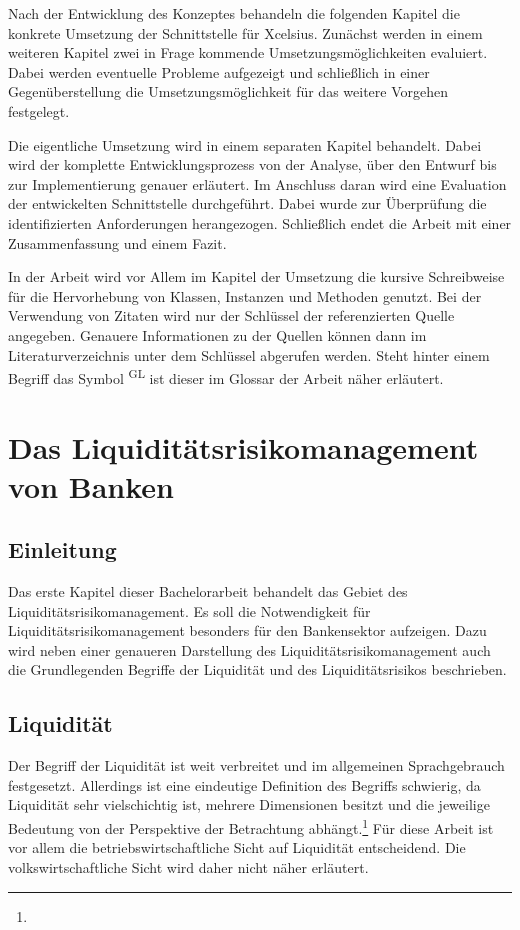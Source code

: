 \begin{onehalfspacing}
Nach der Entwicklung des Konzeptes behandeln die folgenden Kapitel die konkrete Umsetzung der Schnittstelle für Xcelsius. Zunächst werden in einem weiteren Kapitel zwei in Frage kommende Umsetzungsmöglichkeiten evaluiert. Dabei werden eventuelle Probleme aufgezeigt und schließlich in einer Gegenüberstellung die Umsetzungsmöglichkeit für das weitere Vorgehen festgelegt.

Die eigentliche Umsetzung wird in einem separaten Kapitel behandelt. Dabei wird der komplette Entwicklungsprozess von der Analyse, über den Entwurf bis zur Implementierung genauer erläutert.
Im Anschluss daran wird eine Evaluation der entwickelten Schnittstelle durchgeführt. Dabei wurde zur Überprüfung die identifizierten Anforderungen herangezogen. Schließlich endet die Arbeit mit einer Zusammenfassung und einem Fazit.

In der Arbeit wird vor Allem im Kapitel der Umsetzung die kursive Schreibweise für die Hervorhebung von Klassen, Instanzen und Methoden genutzt. Bei der Verwendung von Zitaten wird nur der Schlüssel der referenzierten Quelle angegeben. Genauere Informationen zu der Quellen können dann im Literaturverzeichnis unter dem Schlüssel abgerufen werden. Steht hinter einem Begriff das Symbol \textsuperscript{GL} ist dieser im Glossar der Arbeit näher erläutert.

\chapter{Das Liquiditätsrisikomanagement von Banken}

\section{Einleitung}
Das erste Kapitel dieser Bachelorarbeit behandelt das Gebiet des Liquiditätsrisikomanagement. Es soll die Notwendigkeit für Liquiditätsrisikomanagement besonders für den Bankensektor aufzeigen. Dazu wird neben einer genaueren Darstellung des Liquiditätsrisikomanagement auch die Grundlegenden Begriffe der Liquidität und des Liquiditätsrisikos beschrieben.

\section{Liquidität} 
Der Begriff der Liquidität ist weit verbreitet und im allgemeinen Sprachgebrauch festgesetzt. Allerdings ist eine eindeutige Definition des Begriffs schwierig, da Liquidität sehr vielschichtig ist, mehrere Dimensionen besitzt und die jeweilige Bedeutung von der Perspektive der Betrachtung abhängt.\footnote{ } Für diese Arbeit ist vor allem die betriebswirtschaftliche Sicht auf Liquidität entscheidend. Die volkswirtschaftliche Sicht wird daher nicht näher erläutert.


\end{onehalfspacing}

